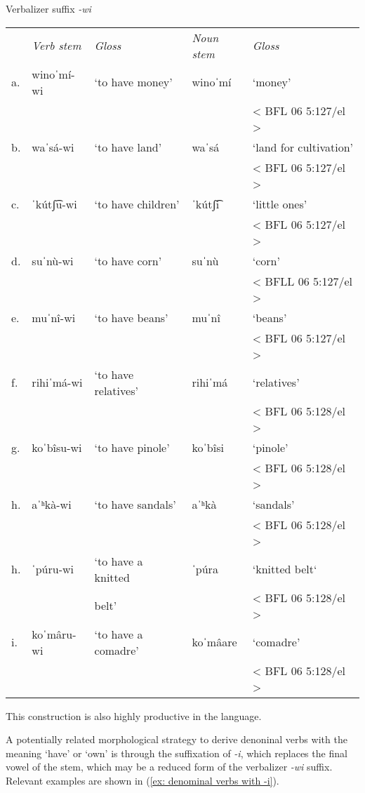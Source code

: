 \ea\label{ex: Verbalizer suffix -wi}
{Verbalizer suffix \textit{-wi}}
\setlength{\tabcolsep}{3pt}
\begin{tabular}{lllll}
    & \textit{Verb stem} & \textit{Gloss} & \textit{Noun stem} & \textit{Gloss} \\
    a. & {winoˈmí-wi}&{‘to have money’}&{winoˈmí}& {‘money’}\\
    & & & & {< BFL 06 5:127/el >}\\
    b. & {waˈsá-wi}&{‘to have land’}&{waˈsá}& {‘land for cultivation’}\\
        & & & & {< BFL 06 5:127/el >}\\
    c.&{ˈkútʃ͡u-wi}&{‘to have children’}&{ˈkútʃ͡i}& {‘little ones’}\\
    & & & & {< BFL 06 5:127/el >}\\
    d.&{suˈnù-wi}&{‘to have corn’}&{suˈnù}&{`corn'}\\
     & & & & {< BFLL 06 5:127/el >}\\
    e.&{muˈnî-wi}&{‘to have beans’}&{muˈnî}&{‘beans’}\\
     & & & & {< BFL 06 5:127/el >}\\
    f.&{rihiˈmá-wi}&{‘to have relatives’}&{rihiˈmá}& {‘relatives’}\\
    & & & & {< BFL 06 5:128/el >}\\
    g.&{koˈbîsu-wi}&{‘to have pinole’}&{koˈbîsi}& {‘pinole’}\\
    & & & & {< BFL 06 5:128/el >}\\
    h.& {aˈʰkà-wi}&{‘to have sandals’}&{aˈʰkà}& {‘sandals’}\\
     & & & &{< BFL 06 5:128/el >}\\
    h.&{ˈpúru-wi}&{‘to have a knitted }&{ˈpúra}& {‘knitted belt‘}\\
     & & belt’ & &{< BFL 06 5:128/el >}\\
    i.&{koˈmâru-wi}&{‘to have a comadre’}&{koˈmâare}& {‘comadre’}\\
     & & & &{< BFL 06 5:128/el >}\\
\end{tabular}
    \z

This construction is also highly productive in the language.

A potentially related morphological strategy to derive denoninal verbs with the meaning `have' or `own' is through the suffixation of \textit{-i}, which replaces the final vowel of the stem, which may be a reduced form of the verbalizer \textit{-wi} suffix. Relevant examples are shown in (\ref{ex: denominal verbs with -i}).


